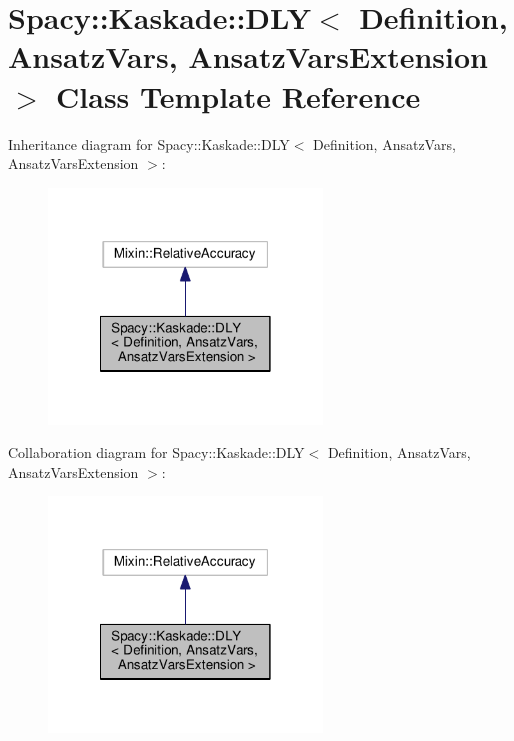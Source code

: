 \hypertarget{classSpacy_1_1Kaskade_1_1DLY}{\section{Spacy\-:\-:Kaskade\-:\-:D\-L\-Y$<$ Definition, Ansatz\-Vars, Ansatz\-Vars\-Extension $>$ Class Template Reference}
\label{classSpacy_1_1Kaskade_1_1DLY}
}


Inheritance diagram for Spacy\-:\-:Kaskade\-:\-:D\-L\-Y$<$ Definition, Ansatz\-Vars, Ansatz\-Vars\-Extension $>$\-:
\nopagebreak
\begin{figure}[H]
\begin{center}
\leavevmode
\includegraphics[width=206pt]{classSpacy_1_1Kaskade_1_1DLY__inherit__graph}
\end{center}
\end{figure}


Collaboration diagram for Spacy\-:\-:Kaskade\-:\-:D\-L\-Y$<$ Definition, Ansatz\-Vars, Ansatz\-Vars\-Extension $>$\-:
\nopagebreak
\begin{figure}[H]
\begin{center}
\leavevmode
\includegraphics[width=206pt]{classSpacy_1_1Kaskade_1_1DLY__coll__graph}
\end{center}
\end{figure}
